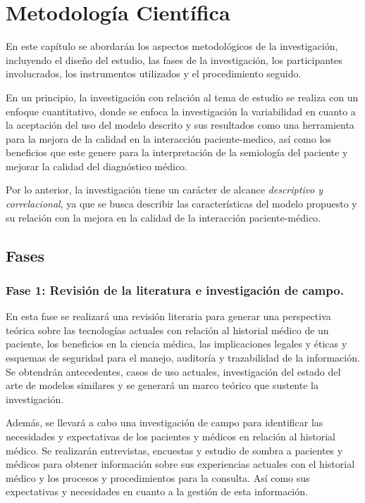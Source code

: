 \section{Metodología Científica}
En este capítulo se abordarán los aspectos metodológicos de la investigación, incluyendo el diseño del estudio, las fases de la investigación, los participantes involucrados, los instrumentos utilizados y el procedimiento seguido.

En un principio, la investigación con relación al tema de estudio se realiza con un enfoque cuantitativo, donde se enfoca la investigación la variabilidad en cuanto a la aceptación del uso del modelo descrito y sus resultados como una herramienta para la mejora de la calidad en la interacción paciente-medico, así como los beneficios que este genere para la interpretación de la semiología del paciente y mejorar la calidad del diagnóstico médico.

Por lo anterior, la investigación tiene un carácter de alcance \textit{descriptivo y correlacional}, ya que se busca describir las características del modelo propuesto y su relación con la mejora en la calidad de la interacción paciente-médico.
    \subsection{Fases}
    \subsubsection{Fase 1: Revisión de la literatura e investigación de campo.}
    En esta fase se realizará una revisión literaria para generar una perspectiva teórica sobre las tecnologías actuales con relación al historial médico de un paciente, los beneficios en la ciencia médica, las implicaciones legales y éticas y esquemas de seguridad para el manejo, auditoría y trazabilidad de la información. Se obtendrán antecedentes, casos de uso actuales, investigación del estado del arte de modelos similares y se generará un marco teórico que sustente la investigación.

    Además, se llevará a cabo una investigación de campo para identificar las necesidades y expectativas de los pacientes y médicos en relación al historial médico. Se realizarán entrevistas, encuestas y estudio de sombra a pacientes y médicos para obtener información sobre sus experiencias actuales con el historial médico y los procesos y procedimientos para la consulta. Así como sus expectativas y necesidades en cuanto a la gestión de esta información.
